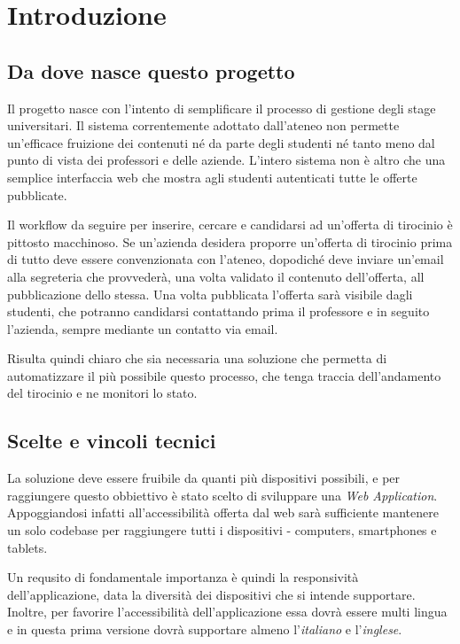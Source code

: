 \chapter{Introduzione}

\section{Da dove nasce questo progetto}

Il progetto \projectName nasce con l'intento di semplificare il processo di gestione degli stage universitari. Il sistema correntemente adottato dall'ateneo non permette un'efficace fruizione dei contenuti né da parte degli studenti né tanto meno dal punto di vista dei professori e delle aziende. L'intero sistema non è altro che una semplice interfaccia web che mostra agli studenti autenticati tutte le offerte pubblicate.

Il workflow da seguire per inserire, cercare e candidarsi ad un'offerta di tirocinio è pittosto macchinoso. Se un'azienda desidera proporre un'offerta di tirocinio prima di tutto deve essere convenzionata con l'ateneo, dopodiché deve inviare un'email alla segreteria che provvederà, una volta validato il contenuto dell'offerta, all pubblicazione dello stessa. Una volta pubblicata l'offerta sarà visibile dagli studenti, che potranno candidarsi contattando prima il professore e in seguito l'azienda, sempre mediante un contatto via email. 

Risulta quindi chiaro che sia necessaria una soluzione che permetta di automatizzare il più possibile questo processo, che tenga traccia dell'andamento del tirocinio e ne monitori lo stato.



\section{Scelte e vincoli tecnici} 

La soluzione deve essere fruibile da quanti più dispositivi possibili, e per raggiungere questo obbiettivo è stato scelto di sviluppare una \textit{Web Application}. Appoggiandosi infatti all'accessibilità offerta dal web sarà sufficiente mantenere un solo codebase per raggiungere tutti i dispositivi - computers, smartphones e tablets.

Un requsito di fondamentale importanza è quindi la responsività dell'applicazione, data la diversità dei dispositivi che si intende supportare. 
Inoltre, per favorire l'accessibilità dell'applicazione essa dovrà essere multi lingua e in questa prima versione dovrà supportare almeno l'\textit{italiano} e l'\textit{inglese}.

